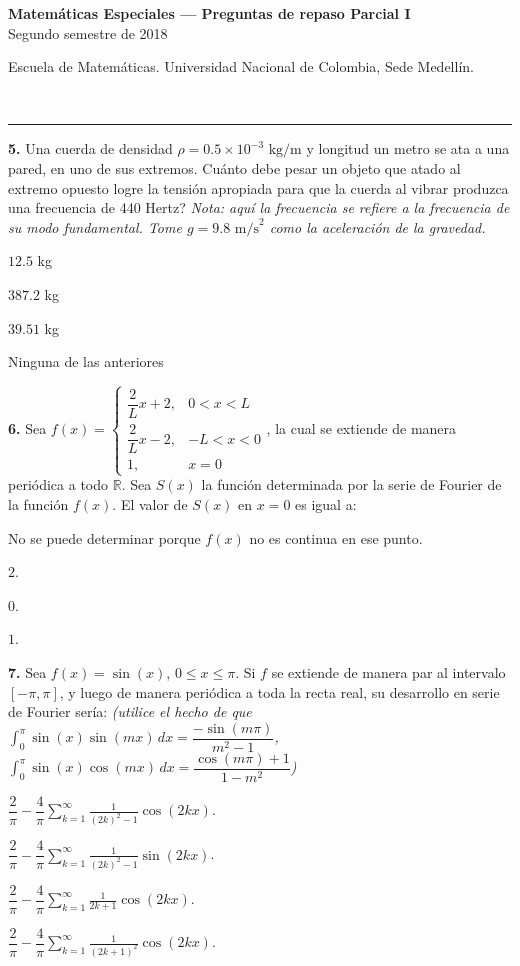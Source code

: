 \documentclass[11pt]{article}
\newcommand{\examheader}{%
  \noindent
  \begin{minipage}[t]{0.6\linewidth}
    {\small\bfseries Matem\'aticas Especiales --- Preguntas de repaso Parcial I}\\
    {\small Segundo semestre de 2018}
  \end{minipage}%
  \hfill
  \begin{minipage}[t]{0.35\linewidth}
    \raggedleft\small Escuela de Matem\'aticas. Universidad Nacional de Colombia, Sede Medell\'in.
  \end{minipage}\\[2pt]
  \rule{\linewidth}{0.6pt}
}
\begin{document}
\clearpage
\examheader
\vspace{4pt}

\textbf{5.} Una cuerda de densidad $\rho = 0.5\times 10^{-3}\text{ kg/m}$ y longitud un metro se ata a una pared, en uno de sus extremos. \textquestiondown Cu\'anto debe pesar un objeto que atado al extremo opuesto logre la tensi\'on apropiada para que la cuerda al vibrar produzca una frecuencia de 440 Hertz? \textit{Nota: aqu\'i la frecuencia se refiere a la frecuencia de su modo fundamental. Tome $g = 9.8\text{ m/s}^2$ como la aceleraci\'on de la gravedad.}
\begin{opciones}
  \item $12.5$ kg
  \item $387.2$ kg
  \item $39.51$ kg
  \item Ninguna de las anteriores
\end{opciones}

\vspace{6pt}
\textbf{6.} Sea $f(x) = \begin{cases} \dfrac{2}{L}x + 2, & 0<x<L \\[4pt] \dfrac{2}{L}x - 2, & -L<x<0 \\[4pt] 1, & x=0 \end{cases}$, la cual se extiende de manera peri\'odica a todo $\mathbb{R}$. Sea $S(x)$ la funci\'on determinada por la serie de Fourier de la funci\'on $f(x)$. El valor de $S(x)$ en $x=0$ es igual a:
\begin{opciones}
  \item No se puede determinar porque $f(x)$ no es continua en ese punto.
  \item $2$.
  \item $0$.
  \item $1$.
\end{opciones}

\vspace{6pt}
\textbf{7.} Sea $f(x) = \sin(x)$, $0\leq x\leq \pi$. Si $f$ se extiende de manera par al intervalo $[-\pi,\pi]$, y luego de manera peri\'odica a toda la recta real, su desarrollo en serie de Fourier ser\'ia: \textit{(utilice el hecho de que $\int_0^\pi \sin(x)\sin(mx)\,dx = \dfrac{-\sin(m\pi)}{m^2-1}$, $\int_0^\pi \sin(x)\cos(mx)\,dx = \dfrac{\cos(m\pi)+1}{1-m^2}$)}
\begin{opciones}
  \item $\dfrac{2}{\pi} - \dfrac{4}{\pi}\displaystyle\sum_{k=1}^{\infty} \frac{1}{(2k)^2-1}\cos(2kx)$.
  \item $\dfrac{2}{\pi} - \dfrac{4}{\pi}\displaystyle\sum_{k=1}^{\infty} \frac{1}{(2k)^2-1}\sin(2kx)$.
  \item $\dfrac{2}{\pi} - \dfrac{4}{\pi}\displaystyle\sum_{k=1}^{\infty} \frac{1}{2k+1}\cos(2kx)$.
  \item $\dfrac{2}{\pi} - \dfrac{4}{\pi}\displaystyle\sum_{k=1}^{\infty} \frac{1}{(2k+1)^2}\cos(2kx)$.
\end{opciones}
\end{document}
